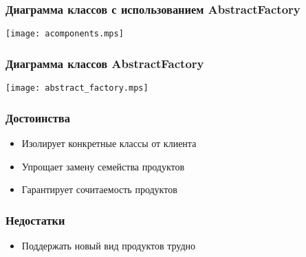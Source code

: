 \documentclass[handout]{beamer}
\begin{document}
\begin{frame}[fragile]
\frametitle{Диаграмма классов с использованием AbstractFactory}
\begin{center}
\texttt{[image: acomponents.mps]}
\end{center}
\end{frame}


\begin{frame}[fragile]
\frametitle{Диаграмма классов AbstractFactory}
\begin{center}
\texttt{[image: abstract\_factory.mps]}
\end{center}
\end{frame}


\begin{frame}[fragile]
\frametitle{Достоинства}
\begin{itemize}
\item Изолирует конкретные классы от клиента
\item Упрощает замену семейства продуктов
\item Гарантирует сочитаемость продуктов
\end{itemize}
\end{frame}


\begin{frame}[fragile]
\frametitle{Недостатки}
\begin{itemize}
\item Поддержать новый вид продуктов трудно
\end{itemize}
\end{frame}
\end{document}

